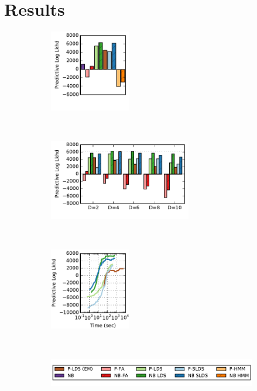 \section{Results}

\begin{figure}
\centering
  \begin{subfigure}[t]{.26\textwidth}
    \centering
    \vskip 0pt
    \includegraphics[height=1.4in]{figures/ch8/pred_ll_best_bar.pdf}
    \label{fig:pred_ll_best}
  \end{subfigure}
  ~
  \hspace{-2em}
  \begin{subfigure}[t]{.46\textwidth}
    \centering
    \vskip 0pt
    \includegraphics[height=1.4in]{figures/ch8/pred_ll_vs_D_bar.pdf}
  \end{subfigure}
  ~
  \begin{subfigure}[t]{.26\textwidth}
    \centering
    \vskip 0pt
    \includegraphics[height=1.4in]{figures/ch8/pred_ll_best_vs_time_D10.pdf}
  \end{subfigure}
  \\
  \begin{subfigure}[t]{\textwidth}
    \centering
    \vskip 0pt
    \includegraphics[width=3.8in]{figures/ch8/pred_ll_legend.pdf}

\end{subfigure}
\end{figure}
